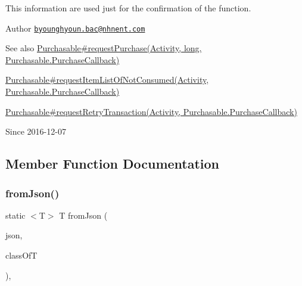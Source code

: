 This information are used just for the confirmation of the function.

\begin{DoxyAuthor}{Author}
\href{mailto:byounghyoun.bac@nhnent.com}{\tt byounghyoun.\+bac@nhnent.\+com} 
\end{DoxyAuthor}
\begin{DoxySeeAlso}{See also}
\hyperlink{}{Purchasable\#request\+Purchase(\+Activity, long, Purchasable.\+Purchase\+Callback)} 

\hyperlink{}{Purchasable\#request\+Item\+List\+Of\+Not\+Consumed(\+Activity, Purchasable.\+Purchase\+Callback)} 

\hyperlink{}{Purchasable\#request\+Retry\+Transaction(\+Activity, Purchasable.\+Purchase\+Callback)} 
\end{DoxySeeAlso}
\begin{DoxySince}{Since}
2016-\/12-\/07 
\end{DoxySince}


\subsection{Member Function Documentation}
\mbox{\label{classcom_1_1toast_1_1android_1_1gamebase_1_1base_1_1_value_object_ae6655c88c20a9a8406dc11b46250ac7b}} 
\subsubsection{\texorpdfstring{from\+Json()}{fromJson()}\hspace{0.1cm}{\footnotesize\ttfamily [1/3]}}
{\footnotesize\ttfamily static $<$T$>$ T from\+Json (\begin{DoxyParamCaption}\item[{@Non\+Null String}]{json,  }\item[{Class$<$ T $>$}]{class\+OfT }\end{DoxyParamCaption})\hspace{0.3cm}{\ttfamily [static]}, {\ttfamily [inherited]}}

